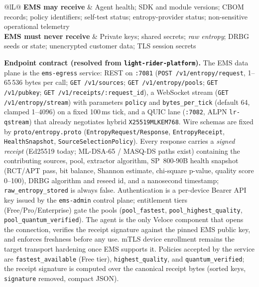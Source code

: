 \documentclass[10pt]{article}
\newcommand{\code}[1]{\texttt{\small #1}}
\begin{document}
\begin{small}
\begin{tabularx}{\textwidth}{@{}lL@{}}
\toprule
\textbf{EMS may receive} & Agent health; SDK and module versions; CBOM records; policy
  identifiers; self-test status; entropy-provider status; non-sensitive operational
  telemetry \\
\textbf{EMS must never receive} & Private keys; shared secrets; \emph{raw entropy}; DRBG
  seeds or state; unencrypted customer data; TLS session secrets \\
\bottomrule
\end{tabularx}
\end{small}

\textbf{Endpoint contract (resolved from \code{light-rider-platform}).} The EMS
data plane is the \code{ems-egress} service: REST on \code{:7081}
(\code{POST /v1/entropy/request}, 1--65\,536 bytes per call; \code{GET /v1/sources};
\code{GET /v1/entropy/pools}; \code{GET /v1/pubkey};
\code{GET /v1/receipts/:request\_id}), a WebSocket stream
(\code{GET /v1/entropy/stream}) with parameters \code{policy} and
\code{bytes\_per\_tick} (default 64, clamped 1--4096) on a fixed 100\,ms tick, and a
QUIC lane (\code{:7082}, ALPN \code{lr-qstream}) that already negotiates hybrid
\code{X25519MLKEM768}. Wire schemas are fixed by
\code{proto/entropy.proto} (\code{EntropyRequest/Response}, \code{EntropyReceipt},
\code{HealthSnapshot}, \code{SourceSelectionPolicy}). Every response carries a
\emph{signed receipt} (Ed25519 today; ML-DSA-65 / MASQ-DS paths exist) containing the
contributing sources, pool, extractor algorithm, SP~800-90B health snapshot (RCT/APT
pass, bit balance, Shannon estimate, chi-square p-value, quality score 0--100),
DRBG algorithm and reseed id, and a nanosecond timestamp; \code{raw\_entropy\_stored}
is always false. Authentication is a per-device Bearer API key issued by the
\code{ems-admin} control plane; entitlement tiers (Free/Pro/Enterprise) gate the pools
(\code{pool\_fastest}, \code{pool\_highest\_quality}, \code{pool\_quantum\_verified}).
The agent is the only Veloce component that opens the connection, verifies the receipt
signature against the pinned EMS public key, and enforces freshness before any use.
mTLS device enrollment remains the target transport hardening once EMS supports it.
Policies accepted by the service are \code{fastest\_available} (Free tier),
\code{highest\_quality}, and \code{quantum\_verified}; the receipt signature is computed
over the canonical receipt bytes (sorted keys, \code{signature} removed, compact JSON).
\end{document}
